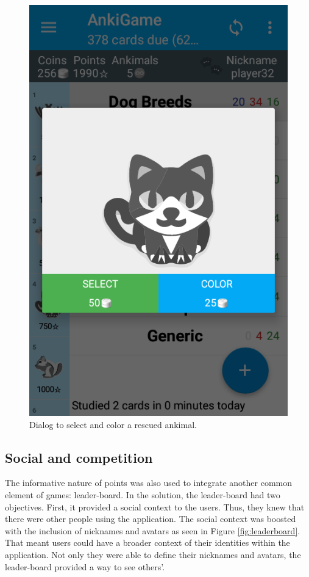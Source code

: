 \begin{figure}[htb]
    \vskip 5mm
        \begin{center}
            \includegraphics[scale=0.4]{./Figures/ankimal_selection.png}
            \caption{Dialog to select and color a rescued ankimal.}
            \label{fig:ankimals-select}
        \end{center}
    \vskip -5mm
\end{figure}

\subsection{Social and competition}
The informative nature of points was also used to integrate another common element of games: leader-board. In the solution, the leader-board had two objectives. First, it provided a social context to the users. Thus, they knew that there were other people using the application. The social context was boosted with the inclusion of nicknames and avatars as seen in Figure \ref{fig:leaderboard}. That meant users could have a broader context of their identities within the application. Not only they were able to define their nicknames and avatars, the leader-board provided a way to see others'.

